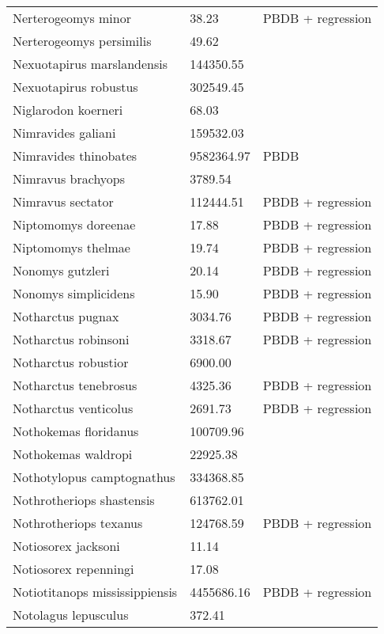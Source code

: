 \documentclass{article}
\begin{document}
\begin{center}
\begin{longtable}{p{} p{} p{}}
    Nerterogeomys minor & 38.23 & PBDB + regression \\ 
    Nerterogeomys persimilis & 49.62 & \cite{Grohe2010} \\ 
    Nexuotapirus marslandensis & 144350.55 & \cite{Tomiya2013} \\ 
    Nexuotapirus robustus & 302549.45 & \cite{Tomiya2013} \\ 
    Niglarodon koerneri & 68.03 & \cite{Tomiya2013} \\ 
    Nimravides galiani & 159532.03 & \cite{Tomiya2013} \\ 
    Nimravides thinobates & 9582364.97 & PBDB \\ 
    Nimravus brachyops & 3789.54 & \cite{Tomiya2013} \\ 
    Nimravus sectator & 112444.51 & PBDB + regression \\ 
    Niptomomys doreenae & 17.88 & PBDB + regression \\ 
    Niptomomys thelmae & 19.74 & PBDB + regression \\ 
    Nonomys gutzleri & 20.14 & PBDB + regression \\ 
    Nonomys simplicidens & 15.90 & PBDB + regression \\ 
    Notharctus pugnax & 3034.76 & PBDB + regression \\ 
    Notharctus robinsoni & 3318.67 & PBDB + regression \\ 
    Notharctus robustior & 6900.00 & \cite{Soligo2006} \\ 
    Notharctus tenebrosus & 4325.36 & PBDB + regression \\ 
    Notharctus venticolus & 2691.73 & PBDB + regression \\ 
    Nothokemas floridanus & 100709.96 & \cite{Tomiya2013} \\ 
    Nothokemas waldropi & 22925.38 & \cite{Tomiya2013} \\ 
    Nothotylopus camptognathus & 334368.85 & \cite{Tomiya2013} \\ 
    Nothrotheriops shastensis & 613762.01 & \cite{Brook2004a} \\ 
    Nothrotheriops texanus & 124768.59 & PBDB + regression \\ 
    Notiosorex jacksoni & 11.14 & \cite{Madden1985} \\ 
    Notiosorex repenningi & 17.08 & \cite{Lillegraven1977} \\ 
    Notiotitanops mississippiensis & 4455686.16 & PBDB + regression \\ 
    Notolagus lepusculus & 372.41 & \cite{Tomiya2013} \\ 

\end{longtable}
\end{center}
\end{document}
